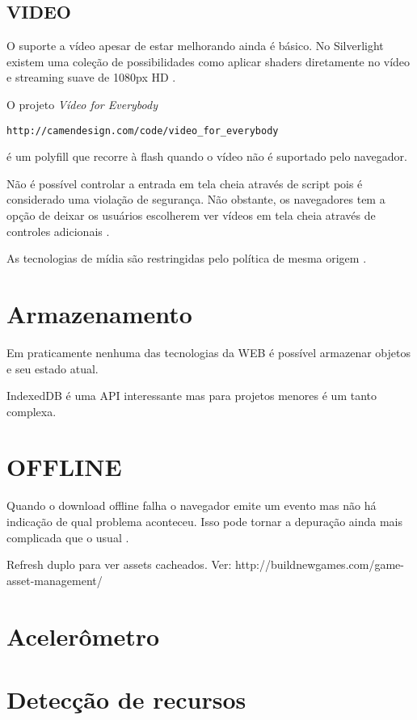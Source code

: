 \begin{draft}
\subsection{VIDEO}

O suporte a vídeo apesar de estar melhorando ainda é básico. No
Silverlight existem uma coleção de possibilidades como aplicar shaders
diretamente no vídeo e streaming suave de 1080px HD \autocite[pp.
8]{researchOnHtml}.

O projeto \textit{Vídeo for Everybody} \begin{verbatim}
http://camendesign.com/code/video_for_everybody \end{verbatim} é um
polyfill que recorre à flash quando o vídeo não é suportado pelo
navegador.

Não é possível controlar a entrada em tela cheia através de script pois 
é considerado uma violação de segurança. Não obstante, os navegadores
tem a opção de deixar os usuários escolherem ver vídeos em tela cheia
através de  controles adicionais \autocite[pp. 68]{proHtml5}.

As tecnologias de mídia são restringidas pelo política de mesma origem \autocite[pp. 68]{proHtml5}.

\section{Armazenamento}

Em praticamente nenhuma das tecnologias da WEB é possível armazenar objetos e  seu estado atual.

IndexedDB é uma API interessante mas para projetos menores é um tanto complexa.

\section{OFFLINE}

Quando o download offline falha o navegador emite um evento mas não há
indicação de qual problema aconteceu. Isso pode tornar a depuração
ainda mais complicada que o usual \autocite{diveIntohtml}.


Refresh duplo para ver assets cacheados. Ver:
http://buildnewgames.com/game-asset-management/

\section{Acelerômetro}

\section{Detecção de recursos}


\end{draft}
